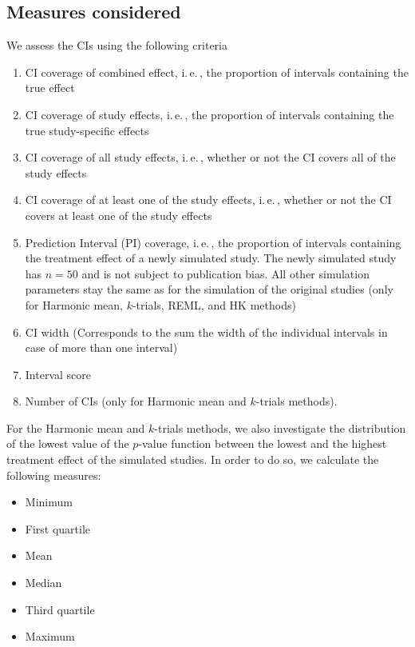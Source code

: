 \documentclass[letterpaper, 9pt]{article}
\newcommand{\ie}{{i.\,e.\,}}
\begin{document}
\subsection{Measures considered} \label{sec:meas}

We assess the CIs using the following criteria
  \begin{enumerate}
  \item CI coverage of combined effect, \ie, the proportion of intervals containing the true effect %
  \item CI coverage of study effects, \ie, the proportion of intervals containing the true study-specific effects %
  \item CI coverage of all study effects, \ie, whether or not the CI covers all of the study effects %
  \item CI coverage of at least one of the study effects, \ie, whether or not the CI covers at least one of the study effects %
  \item Prediction Interval (PI) coverage, \ie, the proportion of intervals containing the treatment effect of a newly simulated study. The newly simulated study has $n = 50$ and is not subject to publication bias. All other simulation parameters stay the same as for the simulation of the original studies (only for Harmonic mean, $k$-trials, REML, and HK methods) %
  \item CI width (Corresponds to the sum the width of the individual intervals in case of more than one interval)%
  \item Interval score \citep{Gnei:Raft:07} %
  \item Number of CIs (only for Harmonic mean and $k$-trials methods). %
  \end{enumerate}

\vspace*{.5cm}

For the Harmonic mean and $k$-trials methods, we also investigate the distribution of the lowest value of the $p$-value function between the lowest and the highest treatment effect of the simulated studies. In order to do so, we calculate the following measures:
\begin{itemize}
\item Minimum
\item First quartile
\item Mean
\item Median
\item Third quartile
\item Maximum
\end{itemize}
\end{document}
